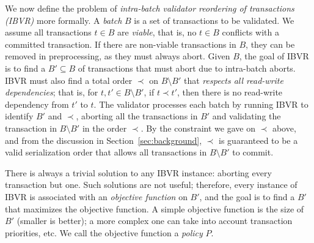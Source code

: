 We now define the problem of {\em intra-batch validator reordering of transactions (IBVR)} more formally. A \emph{batch} $B$ is a set of transactions to be validated. We assume all transactions $t \in B$ are \emph{viable}, that is, no $t \in B$ conflicts with a committed transaction. If there are non-viable transactions in $B$, they can be removed in preprocessing, as they must always abort.
Given $B$, the goal of IBVR is to find a $B' \subseteq B$ of transactions that must abort due to intra-batch aborts. IBVR must also find a 
total order $\prec$ on $B \setminus B'$ that \emph{respects all read-write dependencies}; that is, for $t,t'\in B \setminus B'$, if $t \prec t'$, then there is no read-write dependency from $t'$ to $t$.
The validator processes each batch by running IBVR to identify $B'$ and $\prec$, aborting all the transactions in $B'$  and validating the transaction in $B \setminus B'$  in the order $\prec$. By the constraint we gave on $\prec$ above, and from the discussion in Section~\ref{sec:background}, $\prec$ is guaranteed to be a valid serialization order that allows all transactions in $B \setminus B'$  to commit.



There is always a trivial solution to any IBVR instance: aborting every
transaction but one. Such solutions are not useful; therefore, every instance of
IBVR is associated with an \emph{objective function} on $B'$, and the goal is to
find a $B'$ that maximizes the objective function. A simple objective function
is the size of $B'$ (smaller is better); a more complex one can take into
account transaction priorities, etc. We call the objective function a \emph{policy} $P$.


